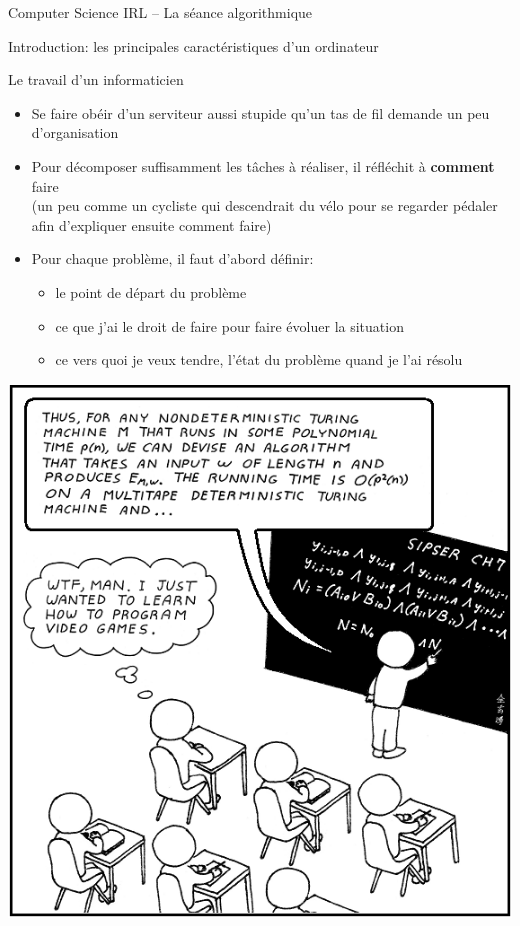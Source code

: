 \documentclass[final,hyperref={pdfpagelabels=false}]{beamer}
\renewenvironment{Coupe}{   }{   }
\renewcommand*{\small}{\fontsize{\resultsmallX}{\resultsmallY}\selectfont}
\begin{document}
\begin{Coupe}
\begin{frame}{Computer Science IRL -- La séance algorithmique}
\begin{block}{Introduction: les principales caractéristiques d'un ordinateur}
\begin{itemize}
\begin{itemize}
      \end{itemize}

    \end{itemize}
  \end{block}\vspace{-.5\baselineskip}

  \begin{block}{Le travail d'un informaticien}
    \begin{itemize}\vspace{-.2\baselineskip}
    \item Se faire obéir d'un serviteur aussi stupide qu'un tas de fil demande
      un peu d'organisation
    \item Pour décomposer suffisamment les tâches à réaliser, il réfléchit à
      \textbf{comment} faire\\
      {\small (un peu comme un cycliste qui descendrait du vélo pour se regarder
        pédaler afin d'expliquer ensuite comment faire)}
    \item Pour chaque problème, il faut d'abord définir:
      \begin{itemize}
      \item {} le point de départ du problème
      \item {} ce que j'ai le droit de faire pour faire
        évoluer la situation
      \item {} ce vers quoi je veux tendre, l'état
        du problème quand je l'ai résolu
      \end{itemize}
    \end{itemize}
  \end{block}


  \centerline{\includegraphics[width=.4\linewidth]{img/computer_science_major.PNG}\label{img:CSmajor}}
\end{frame}
\newcommand{\clou}[3]{\draw[#3,line width=2pt] (.5*#1,.6*#2) -- +(.3,0) --  +(.15,0) -- +(.15,.5);}
\newcommand{\clous}[2]{\foreach \x/\y in {#2} {\clou{\x}{\y}{#1}}}


\end{Coupe}
\end{document}
